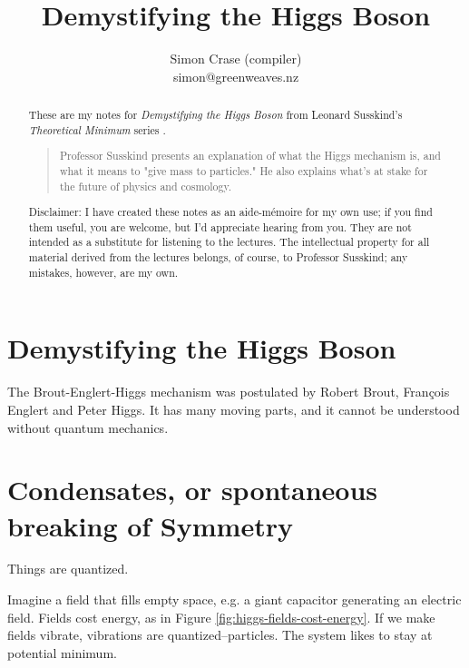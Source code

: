 \documentclass[]{article}
\title{Demystifying the Higgs Boson}
\author{Simon Crase (compiler)\\simon@greenweaves.nz}
\begin{document}
\maketitle

\begin{abstract}
These are my notes for \emph{Demystifying the Higgs Boson}  from Leonard Susskind's \emph{Theoretical Minimum} series \cite[Demystifying the Higgs Boson]{susskind2007theoretical}.

\begin{quotation}
	Professor Susskind presents an explanation of what the Higgs mechanism is, and what it means to "give mass to particles." He also explains what's at stake for the future of physics and cosmology.
\end{quotation}

Disclaimer: I have created these notes as an aide-m\'emoire for my own use; if you find them useful, you are welcome, but I'd appreciate hearing from you. They are not intended as a substitute for listening to the lectures. The intellectual property for all material derived from the lectures belongs, of course, to Professor Susskind; any mistakes, however, are my own.


\end{abstract}

\tableofcontents
\listoffigures
\listoftables
\listoftheorems

\section{Demystifying the Higgs Boson}

The  Brout-Englert-Higgs mechanism was postulated by Robert Brout, Fran\c{c}ois Englert and Peter Higgs. It has many moving parts, and it cannot be understood without quantum mechanics.

\section{Condensates, or spontaneous breaking of Symmetry}

Things are quantized.

Imagine a field that fills empty space, e.g. a giant capacitor generating an electric field. Fields cost energy, as in Figure \ref{fig:higgs-fields-cost-energy}. If we make fields vibrate, vibrations are quantized--particles. The system likes to stay at potential minimum.
\end{document}
